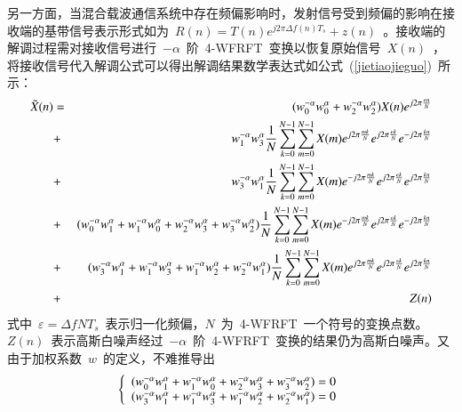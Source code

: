 另一方面，当混合载波通信系统中存在频偏影响时，发射信号受到频偏的影响在接收端的基带信号表示形式如为~$R(n) = T(n){e^{j2\pi \Delta f(n){T_s}}} + z(n)$~。接收端的解调过程需对接收信号进行~$-\alpha$~阶~4-WFRFT~变换以恢复原始信号~$X(n)$~，将接收信号代入解调公式可以得出解调结果数学表达式如公式~(\ref{jietiaojieguo})~所示：
\begin{eqnarray}\label{jietiaojieguo}
\tilde X(n) &=& (w_0^{ - \alpha }w_0^\alpha  + w_2^{ - \alpha }w_2^\alpha )X(n){e^{j2\pi \frac{{\varepsilon n}}{N}}} \nonumber \\
&+& {\rm{ }}w_1^{ - \alpha }w_3^\alpha \frac{1}{N}\sum\limits_{k = 0}^{N - 1} {\sum\limits_{m = 0}^{N - 1} {X(m){e^{j2\pi \frac{{mk}}{N}}}{e^{j2\pi \frac{{\varepsilon k}}{N}}}{e^{ - j2\pi \frac{{kn}}{N}}}} } \nonumber \\
&+& {\rm{ }}w_3^{ - \alpha }w_1^\alpha \frac{1}{N}\sum\limits_{k = 0}^{N - 1} {\sum\limits_{m = 0}^{N - 1} {X(m){e^{ - j2\pi \frac{{mk}}{N}}}{e^{j2\pi \frac{{\varepsilon k}}{N}}}{e^{j2\pi \frac{{kn}}{N}}}} } \nonumber \\
&+& {\rm{ (}}w_0^{ - \alpha }w_1^\alpha  + w_1^{ - \alpha }w_0^\alpha  + w_2^{ - \alpha }w_3^\alpha  + w_3^{ - \alpha }w_2^\alpha )\frac{1}{N}\sum\limits_{k = 0}^{N - 1} {\sum\limits_{m = 0}^{N - 1} {X(m){e^{ - j2\pi \frac{{mk}}{N}}}{e^{j2\pi \frac{{\varepsilon k}}{N}}}{e^{ - j2\pi \frac{{kn}}{N}}}} } \nonumber \\
&+& {\rm{ (}}w_3^{ - \alpha }w_1^\alpha  + w_1^{ - \alpha }w_3^\alpha  + w_1^{ - \alpha }w_2^\alpha  + w_2^{ - \alpha }w_1^\alpha )\frac{1}{N}\sum\limits_{k = 0}^{N - 1} {\sum\limits_{m = 0}^{N - 1} {X(m){e^{j2\pi \frac{{mk}}{N}}}{e^{j2\pi \frac{{\varepsilon k}}{N}}}{e^{j2\pi \frac{{kn}}{N}}}} } \nonumber \\
&+& Z(n)
\end{eqnarray}
式中~$\varepsilon  = \Delta fN{T_s}$~表示归一化频偏，$N$~为~4-WFRFT~一个符号的变换点数。~$Z(n)$~表示高斯白噪声经过~$-\alpha$~阶~4-WFRFT~变换的结果仍为高斯白噪声。又由于加权系数~$w$~的定义，不难推导出
\begin{equation}
\left\{ \begin{array}{l}
{\rm{(}}w_0^{ - \alpha }w_1^\alpha  + w_1^{ - \alpha }w_0^\alpha  + w_2^{ - \alpha }w_3^\alpha  + w_3^{ - \alpha }w_2^\alpha ) = 0\\
{\rm{(}}w_3^{ - \alpha }w_1^\alpha  + w_1^{ - \alpha }w_3^\alpha  + w_1^{ - \alpha }w_2^\alpha  + w_2^{ - \alpha }w_1^\alpha ) = 0
\end{array} \right.
\end{equation}
